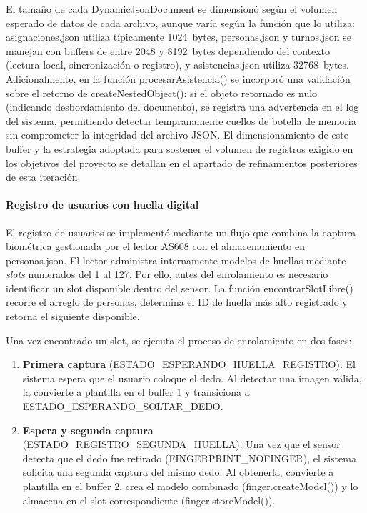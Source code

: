 El tamaño de cada DynamicJsonDocument se dimensionó según el volumen esperado de datos de cada archivo, aunque varía según la función que lo utiliza: asignaciones.json utiliza típicamente 1024~bytes, personas.json y turnos.json se manejan con buffers de entre 2048 y 8192~bytes dependiendo del contexto (lectura local, sincronización o registro), y asistencias.json utiliza 32768~bytes. Adicionalmente, en la función procesarAsistencia() se incorporó una validación sobre el retorno de createNestedObject(): si el objeto retornado es nulo (indicando desbordamiento del documento), se registra una advertencia en el log del sistema, permitiendo detectar tempranamente cuellos de botella de memoria sin comprometer la integridad del archivo JSON. El dimensionamiento de este buffer y la estrategia adoptada para sostener el volumen de registros exigido en los objetivos del proyecto se detallan en el apartado de refinamientos posteriores de esta iteración.

\paragraph{Registro de usuarios con huella digital}

El registro de usuarios se implementó mediante un flujo que combina la captura biométrica gestionada por el lector AS608 con el almacenamiento en personas.json. El lector administra internamente modelos de huellas mediante \textit{slots} numerados del 1 al 127. Por ello, antes del enrolamiento es necesario identificar un slot disponible dentro del sensor. La función encontrarSlotLibre() recorre el arreglo de personas, determina el ID de huella más alto registrado y retorna el siguiente disponible.

Una vez encontrado un slot, se ejecuta el proceso de enrolamiento en dos fases:

\begin{enumerate}
    \item \textbf{Primera captura} (ESTADO\_ESPERANDO\_HUELLA\_REGISTRO): El sistema espera que el usuario coloque el dedo. Al detectar una imagen válida, la convierte a plantilla en el buffer 1 y transiciona a ESTADO\_ESPERANDO\_SOLTAR\_DEDO.
    \item \textbf{Espera y segunda captura} (ESTADO\_REGISTRO\_SEGUNDA\_HUELLA): Una vez que el sensor detecta que el dedo fue retirado (FINGERPRINT\_NOFINGER), el sistema solicita una segunda captura del mismo dedo. Al obtenerla, convierte a plantilla en el buffer 2, crea el modelo combinado (finger.createModel()) y lo almacena en el slot correspondiente (finger.storeModel()).
\end{enumerate}

